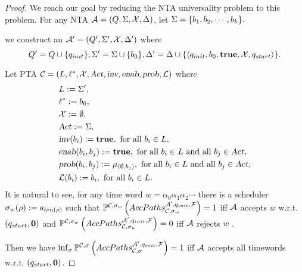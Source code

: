 \begin{proof}
We reach our goal by reducing the NTA universality problem to this problem.
For any NTA $\mathcal{A} = (Q,\Sigma,\mathcal{X},\Delta)$, let $\Sigma = \{b_{1}, b_{2}, \cdots, b_{k}\}.$

we construct an $\mathcal{A}' = (Q', \Sigma', \mathcal{X}, \Delta')$ where
$$
    Q'   = Q  \cup \{ q_{init} \},
    \Sigma'  = \Sigma \cup \{ b_{0} \},
    \Delta'     = \Delta    \cup \{ \langle
            q_{init},
            b_{0},
            \mathbf{true},
            \mathcal{X},
            q_{start}
        \rangle
    \}.
$$

Let PTA $\mathcal{C}=\left(L, \ell^*, \mathcal{X}, \mbox{\sl Act}, \mbox{\sl inv}, \mbox{\sl enab},  \mbox{\sl prob}, \mathcal{L}\right)$ where
\begin{align*}
    &L      :=  \Sigma',\\
    &\ell^*     :=  b_{0}, \\
    &\mathcal{X}    :=  \emptyset, \\
    &\mbox{\sl Act}      :=  \Sigma, \\ 
    &\mbox{\sl inv}(b_{i})                :=  \mathbf{true}, 
                                    \text{ for all } b_{i} \in L,\\
    &\mbox{\sl enab}(b_{i},b_{j})     :=  \mathbf{true},
                                    \text{ for all } b_{i} \in L \text{ and all } b_{j} \in \mbox{\sl Act},\\
    &\mbox{\sl prob}(b_{i},b_{j})     :=  \mu_{ \left (
                                        \emptyset,b_{j}
                                    \right)}, 
                                    \text{ for all } b_{i} \in L \text{ and all } b_{j} \in \mbox{\sl Act},\\
    &\mathcal{L}(b_{i})             :=  b_{i},
                                    \text{ for all } b_{i} \in L.
\end{align*}
It is natural to see, for any time word $ w = \alpha_0 \alpha_1 \alpha_2 \cdots $
there is a scheduler $ \sigma_w (\rho ) := a_{len(\rho)} $ such that $ \mathbb{P}^{\mathcal{C},\sigma_w }\left( AccPaths _{\mathcal{C},\sigma_w} ^{\mathcal{A}',q_{init},\mathcal{F}} \right) = 1 $
iff $\mathcal{A}$ accepts $w$ w.r.t. $(q_{start},\mathbf{0})$ and $\mathbb{P}^{\mathcal{C},\sigma_w }\left( AccPaths _{\mathcal{C},\sigma_w} ^{\mathcal{A}',q_{init},\mathcal{F}} \right) = 0$ iff $\mathcal{A}$ rejects $w$ .

Then we have
$
\inf_\sigma \mathbb{P}^{\mathcal{C},\sigma}\left(
    AccPaths _{\mathcal{C},\sigma} ^{\mathcal{A}',q_{init},\mathcal{F}}
\right)
    = 1
$
iff
$\mathcal{A}$ accepts all timewords w.r.t. $(q_{start},\mathbf{0})$.
\end{proof}